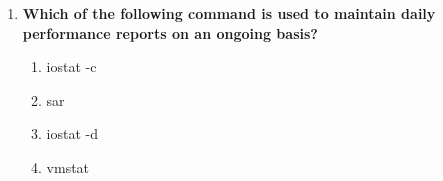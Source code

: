 \begin{flushleft}
\begin{enumerate}
		\item \textbf{Which of the following command is used to maintain daily performance reports on an ongoing basis?}
		\begin{enumerate}[label=(\alph*)]
			\item iostat -c
			\item sar       %
			\item iostat -d 
			\item vmstat
			\end{enumerate}
			\bigskip
			\bigskip			
		
	\end{enumerate}
\end{flushleft}

\newpage

